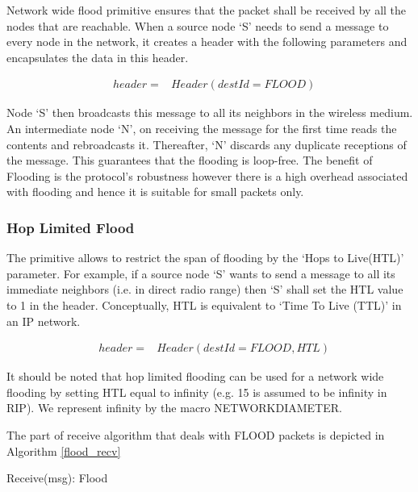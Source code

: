 Network wide flood primitive ensures that the packet shall be received by all the nodes that are reachable. When a source node `S' needs to send a message to every node in the network, it creates a header with the following parameters and encapsulates the data in this header.

\begin{eqnarray*}
& header = &Header(destId = FLOOD)
\end{eqnarray*} 

Node `S' then broadcasts this message to all its neighbors in the wireless medium. An intermediate node `N', on receiving the message for the first time reads the contents and rebroadcasts it. Thereafter, `N' discards any duplicate receptions of the message. This guarantees that the flooding is loop-free. The benefit of Flooding is the protocol's robustness however there is a high overhead associated with flooding and hence it is suitable for small packets only.

\subsubsection{Hop Limited Flood}

The primitive allows to restrict the span of flooding by the `Hops to Live(HTL)' parameter. For example, if a source node `S' wants to send a message to all its immediate neighbors (i.e. in direct radio range) then `S' shall set the HTL value to 1 in the header. Conceptually, HTL is equivalent to `Time To Live (TTL)' in an IP network. 

\begin{eqnarray*}
& header = &Header(destId = FLOOD, HTL)
\end{eqnarray*} 

It should be noted that hop limited flooding can be used for a network wide flooding by setting HTL equal to infinity (e.g. 15 is assumed to be infinity in RIP). We represent infinity by the macro NETWORK\textunderscore DIAMETER.

The part of receive algorithm that deals with FLOOD packets is depicted in Algorithm \ref{flood_recv}

\begin{algorithm}
\caption{Receive(msg): Flood} 
\label{flood_recv}
\DontPrintSemicolon
{}

\end{algorithm}

